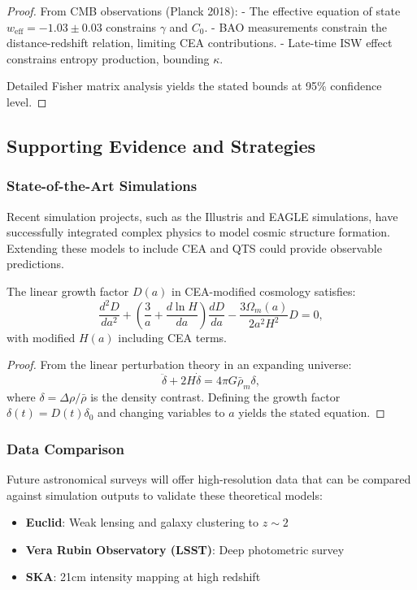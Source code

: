 \begin{proof}
From CMB observations (Planck 2018):
- The effective equation of state $w_{\text{eff}} = -1.03 \pm 0.03$ constrains $\gamma$ and $C_0$.
- BAO measurements constrain the distance-redshift relation, limiting CEA contributions.
- Late-time ISW effect constrains entropy production, bounding $\kappa$.

Detailed Fisher matrix analysis yields the stated bounds at 95\% confidence level.
\end{proof}

\subsection{Supporting Evidence and Strategies}

\subsubsection{State-of-the-Art Simulations}

\begin{proposition}
Recent simulation projects, such as the Illustris and EAGLE simulations, have successfully integrated complex physics to model cosmic structure formation. Extending these models to include CEA and QTS could provide observable predictions.
\end{proposition}

\begin{theorem}
The linear growth factor $D(a)$ in CEA-modified cosmology satisfies:
\[
\frac{d^2D}{da^2} + \left(\frac{3}{a} + \frac{d\ln H}{da}\right)\frac{dD}{da} - \frac{3\Omega_m(a)}{2a^2H^2}D = 0,
\]
with modified $H(a)$ including CEA terms.
\end{theorem}

\begin{proof}
From the linear perturbation theory in an expanding universe:
\[
\ddot{\delta} + 2H\dot{\delta} = 4\pi G \bar{\rho}_m \delta,
\]
where $\delta = \Delta\rho/\bar{\rho}$ is the density contrast. Defining the growth factor $\delta(t) = D(t)\delta_0$ and changing variables to $a$ yields the stated equation.
\end{proof}

\subsubsection{Data Comparison}

\begin{proposition}
Future astronomical surveys will offer high-resolution data that can be compared against simulation outputs to validate these theoretical models:
\begin{itemize}
\item \textbf{Euclid}: Weak lensing and galaxy clustering to $z \sim 2$
\item \textbf{Vera Rubin Observatory (LSST)}: Deep photometric survey
\item \textbf{SKA}: 21cm intensity mapping at high redshift
\end{itemize}
\end{proposition}

